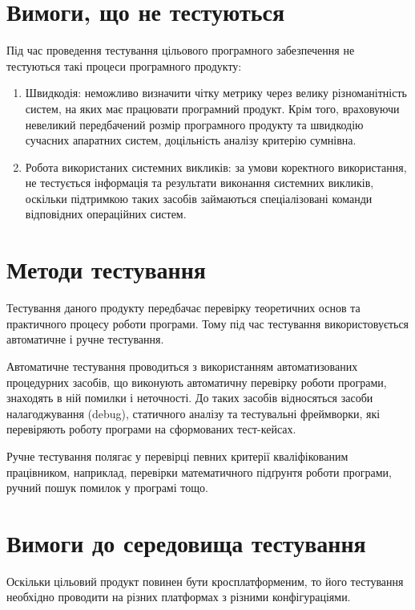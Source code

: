 \documentclass[a4paper,oneside,DIV=12,12pt]{scrartcl}
\begin{document}
    \section{Вимоги, що не тестуються}
		Під час проведення тестування цільового програмного забезпечення не тестуються такі процеси програмного продукту:
		\begin{enumerate}
			\item Швидкодія: неможливо визначити чітку метрику через велику різноманітність систем, на яких має працювати програмний продукт. Крім того, враховуючи невеликий передбачений розмір програмного продукту та швидкодію сучасних апаратних систем, доцільність аналізу критерію сумнівна.
			\item Робота використаних системних викликів: за умови коректного використання, не тестується інформація та результати виконання системних викликів, оскільки підтримкою таких засобів займаються спеціалізовані команди відповідних операційних систем.
		\end{enumerate}
		
    \section{Методи тестування}
		Тестування даного продукту передбачає перевірку теоретичних основ та практичного процесу роботи програми. Тому під час тестування використовується автоматичне і ручне тестування.
		
		Автоматичне тестування проводиться з використанням автоматизованих процедурних засобів, що виконують автоматичну перевірку роботи програми, знаходять в ній помилки і неточності. До таких засобів відносяться засоби налагоджування (debug), статичного аналізу та тестувальні фреймворки, які перевіряють роботу програми на сформованих тест-кейсах.
		
		Ручне тестування полягає у перевірці певних критерії кваліфікованим працівником, наприклад, перевірки математичного підґрунтя роботи програми, ручний пошук помилок у програмі тощо.
		
    \section{Вимоги до середовища тестування}
		\label{sec:testenvreq}
		Оскільки цільовий продукт повинен бути кросплатформеним, то його тестування необхідно проводити на різних платформах з різними конфігураціями.
		
\end{document}
